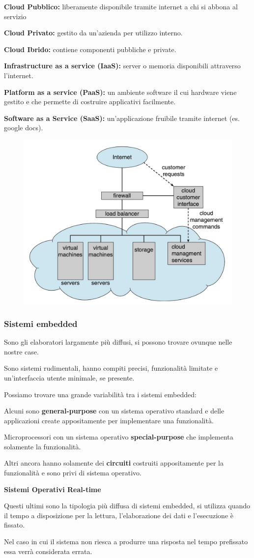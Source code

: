 \spacer
\begin{sitemize}
    \item \textbf{Cloud Pubblico:} liberamente disponibile tramite internet a chi si abbona al servizio
    \item \textbf{Cloud Privato:} gestito da un'azienda per utilizzo interno.
    \item \textbf{Cloud Ibrido:} contiene componenti pubbliche e private.
    \item \textbf{Infrastructure as a service (IaaS):} server o memoria disponibili attraverso l'internet.
    \item \textbf{Platform as a service (PaaS):} un ambiente software il cui hardware viene gestito e che permette di costruire applicativi facilmente.
    \item \textbf{Software as a Service (SaaS):} un'applicazione fruibile tramite internet (es. google docs).
\end{sitemize}

\begin{figure}[H]
    \centering
    \includegraphics[width=0.35\linewidth]{assets/cloud-computing.jpg}
\end{figure}

\subsubsection*{Sistemi embedded}
Sono gli elaboratori largamente più diffusi, si possono trovare ovunque nelle nostre case.

Sono sistemi rudimentali, hanno compiti precisi, funzionalità limitate e un'interfaccia utente minimale, se presente.

\spacer
Possiamo trovare una grande variabilità tra i sistemi embedded:
\begin{sitemize}
    \item Alcuni sono \textbf{general-purpose} con un sistema operativo standard e delle applicazioni create appositamente per implementare una funzionalità.
    \item Microprocessori con un sistema operativo \textbf{special-purpose} che implementa solamente la funzionalità.
    \item Altri ancora hanno solamente dei \textbf{circuiti} costruiti appositamente per la funzionalità e sono privi di sistema operativo.
    \item \textbf{Sistemi Operativi Real-time}
\end{sitemize}

\spacer
Questi ultimi sono la tipologia più diffusa di sistemi embedded, si utilizza quando il tempo a disposizione per la lettura, l'elaborazione dei dati e l'esecuzione è fissato.

Nel caso in cui il sistema non riesca a produrre una risposta nel tempo prefissato essa verrà considerata errata.
